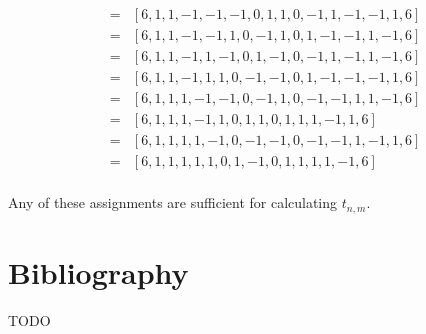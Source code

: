 \documentclass[12pt]{article}
\theoremstyle{plain}
\theoremstyle{definition}
\theoremstyle{remark}
\theoremstyle{definition}
\begin{document}
\begin{eqnarray*}
    & = & [6, 1, 1, -1, -1, -1, 0, 1, 1, 0, -1, 1, -1, -1, 1, 6] \\
    & = & [6, 1, 1, -1, -1, 1, 0, -1, 1, 0, 1, -1, -1, 1, -1, 6] \\
    & = & [6, 1, 1, -1, 1, -1, 0, 1, -1, 0, -1, 1, -1, 1, -1, 6] \\
    & = & [6, 1, 1, -1, 1, 1, 0, -1, -1, 0, 1, -1, -1, -1, 1, 6] \\
    & = & [6, 1, 1, 1, -1, -1, 0, -1, 1, 0, -1, -1, 1, 1, -1, 6] \\
    & = & [6, 1, 1, 1, -1, 1, 0, 1, 1, 0, 1, 1, 1, -1, 1, 6] \\
    & = & [6, 1, 1, 1, 1, -1, 0, -1, -1, 0, -1, -1, 1, -1, 1, 6] \\
    & = & [6, 1, 1, 1, 1, 1, 0, 1, -1, 0, 1, 1, 1, 1, -1, 6] \\
\end{eqnarray*}

Any of these assignments are sufficient for calculating $t_{n,m}$. 

\section{Bibliography}

TODO
\end{document}
